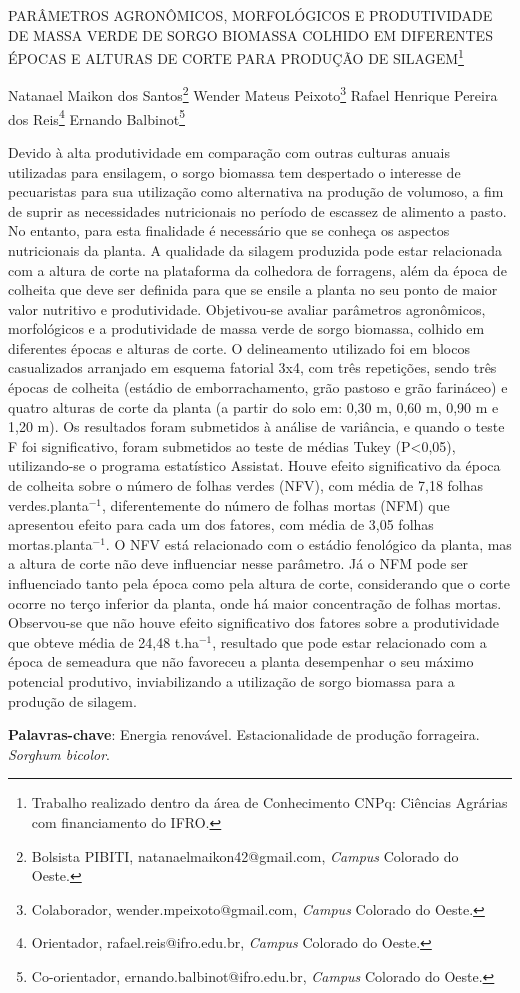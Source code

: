 \documentclass[article,12pt,onesidea,4paper,english,brazil]{abntex2}
\begin{document}
	
	
	\frenchspacing 
	
	\begin{center}
		\LARGE PARÂMETROS AGRONÔMICOS, MORFOLÓGICOS E PRODUTIVIDADE DE
		MASSA VERDE DE SORGO BIOMASSA COLHIDO EM DIFERENTES ÉPOCAS E
		ALTURAS DE CORTE PARA PRODUÇÃO DE SILAGEM\footnote{Trabalho realizado dentro da área de Conhecimento CNPq: Ciências Agrárias com financiamento do IFRO.}
		
		\normalsize
		Natanael Maikon dos Santos\footnote{Bolsista PIBITI, natanaelmaikon42@gmail.com, \textit{Campus} Colorado do Oeste.} 
		Wender Mateus Peixoto\footnote{Colaborador, wender.mpeixoto@gmail.com, \textit{Campus} Colorado do Oeste.} 
		Rafael Henrique Pereira dos Reis\footnote{Orientador, rafael.reis@ifro.edu.br, \textit{Campus} Colorado do Oeste.} 
		Ernando Balbinot\footnote{Co-orientador, ernando.balbinot@ifro.edu.br, \textit{Campus} Colorado do Oeste.} 
	\end{center}
	
	\noindent Devido à alta produtividade em comparação com outras culturas anuais utilizadas
	para ensilagem, o sorgo biomassa tem despertado o interesse de pecuaristas para
	sua utilização como alternativa na produção de volumoso, a fim de suprir as
	necessidades nutricionais no período de escassez de alimento a pasto. No entanto,
	para esta finalidade é necessário que se conheça os aspectos nutricionais da planta.
	A qualidade da silagem produzida pode estar relacionada com a altura de corte na
	plataforma da colhedora de forragens, além da época de colheita que deve ser
	definida para que se ensile a planta no seu ponto de maior valor nutritivo e
	produtividade. Objetivou-se avaliar parâmetros agronômicos, morfológicos e a
	produtividade de massa verde de sorgo biomassa, colhido em diferentes épocas e
	alturas de corte. O delineamento utilizado foi em blocos casualizados arranjado em
	esquema fatorial 3x4, com três repetições, sendo três épocas de colheita (estádio de
	emborrachamento, grão pastoso e grão farináceo) e quatro alturas de corte da
	planta (a partir do solo em: 0,30 m, 0,60 m, 0,90 m e 1,20 m). Os resultados foram
	submetidos à análise de variância, e quando o teste F foi significativo, foram
	submetidos ao teste de médias Tukey (P<0,05), utilizando-se o programa estatístico
	Assistat. Houve efeito significativo da época de colheita sobre o número de folhas
	verdes (NFV), com média de 7,18 folhas verdes.planta$^{-1}$, diferentemente do número
	de folhas mortas (NFM) que apresentou efeito para cada um dos fatores, com média
	de 3,05 folhas mortas.planta$^{-1}$. O NFV está relacionado com o estádio fenológico da planta, mas a altura de corte não deve influenciar nesse parâmetro. Já o NFM pode ser influenciado tanto pela época como pela altura de corte, considerando que o corte ocorre no terço inferior da planta, onde há maior concentração de folhas mortas. Observou-se que não houve efeito significativo dos fatores sobre a
	produtividade que obteve média de 24,48 t.ha$^{-1}$, resultado que pode estar
	relacionado com a época de semeadura que não favoreceu a planta desempenhar o
	seu máximo potencial produtivo, inviabilizando a utilização de sorgo biomassa para
	a produção de silagem.
	
	\vspace{\onelineskip}
	
	\noindent
	\textbf{Palavras-chave}: Energia renovável. Estacionalidade de produção forrageira.
	\textit{Sorghum bicolor}.	
	
\end{document}
